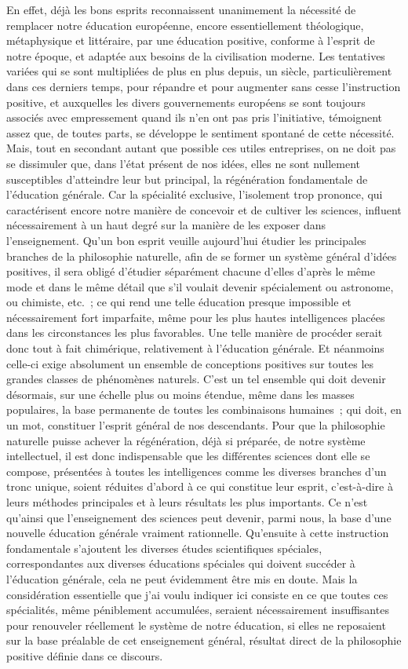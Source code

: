\documentclass[french,twoside]{book} %
\begin{document}
En effet, déjà les bons esprits reconnaissent unanimement la nécessité de remplacer notre éducation européenne, encore essentiellement théologique, métaphysique et littéraire, par une éducation positive, conforme à l’esprit de notre époque, et adaptée aux besoins de la civilisation moderne. Les tentatives variées qui se sont multipliées de plus en plus depuis, un siècle, particulièrement dans ces derniers temps, pour répandre et pour augmenter sans cesse l’instruction positive, et auxquelles les divers gouvernements européens se sont toujours associés avec empressement quand ils n’en ont pas pris l’initiative, témoignent assez que, de toutes parts, se développe le sentiment spontané de cette nécessité. Mais, tout en secondant autant que possible ces utiles entreprises, on ne doit pas se dissimuler que, dans l’état présent de nos idées, elles ne sont nullement susceptibles d’atteindre leur but principal, la régénération fondamentale de l’éducation générale. Car la spécialité exclusive, l’isolement trop prononce, qui caractérisent encore notre manière de concevoir et de cultiver les sciences, influent nécessairement à un haut degré sur la manière de les exposer dans l’enseignement. Qu’un bon esprit veuille aujourd’hui étudier les principales branches de la philosophie naturelle, afin de se former un système général d’idées positives, il sera obligé d’étudier séparément chacune d’elles d’après le même mode et dans le même détail que s’il voulait devenir spécialement ou astronome, ou chimiste, etc. ; ce qui rend une telle éducation presque impossible et nécessairement fort imparfaite, même pour les plus hautes intelligences placées dans les circonstances les plus favorables. Une telle manière de procéder serait donc tout à fait chimérique, relativement à l’éducation générale. Et néanmoins celle-ci exige absolument un ensemble de conceptions positives sur toutes les grandes classes de phénomènes naturels. C’est un tel ensemble qui doit devenir désormais, sur une échelle plus ou moins étendue, même dans les masses populaires, la base permanente de toutes les combinaisons humaines ; qui doit, en un mot, constituer l’esprit général de nos descendants. Pour que la philosophie naturelle puisse achever la régénération, déjà si préparée, de notre système intellectuel, il est donc indispensable que les différentes sciences dont elle se compose, présentées à toutes les intelligences comme les diverses branches d’un tronc unique, soient réduites d’abord à ce qui constitue leur esprit, c’est-à-dire à leurs méthodes principales et à leurs résultats les plus importants. Ce n’est qu’ainsi que l’enseignement des sciences peut devenir, parmi nous, la base d’une nouvelle éducation générale vraiment rationnelle. Qu’ensuite à cette instruction fondamentale s’ajoutent les diverses études scientifiques spéciales, correspondantes aux diverses éducations spéciales qui doivent succéder à l’éducation générale, cela ne peut évidemment être mis en doute. Mais la considération essentielle que j’ai voulu indiquer ici consiste en ce que toutes ces spécialités, même péniblement accumulées, seraient nécessairement insuffisantes pour renouveler réellement le système de notre éducation, si elles ne reposaient sur la base préalable de cet enseignement général, résultat direct de la philosophie positive définie dans ce discours.\par
\end{document}
